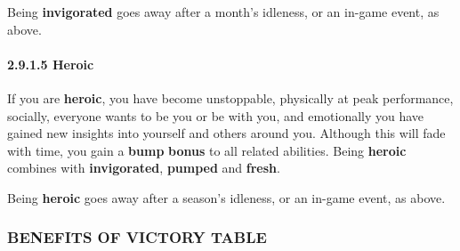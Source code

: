 \documentclass[
]{article}
\begin{document}
Being \textbf{invigorated} goes away after a month's idleness, or an
in-game event, as above.

\hypertarget{heroic}{%
\paragraph{2.9.1.5 Heroic}\label{heroic}}

If you are \textbf{heroic}, you have become unstoppable, physically at
peak performance, socially, everyone wants to be you or be with you, and
emotionally you have gained new insights into yourself and others around
you. Although this will fade with time, you gain a \textbf{bump}
\textbf{bonus} to all related abilities. Being \textbf{heroic} combines
with \textbf{invigorated}, \textbf{pumped} and \textbf{fresh}.

Being \textbf{heroic} goes away after a season's idleness, or an in-game
event, as above.

\hypertarget{benefits-of-victory-table}{%
\subsubsection{BENEFITS OF VICTORY
TABLE}\label{benefits-of-victory-table}}
\end{document}

